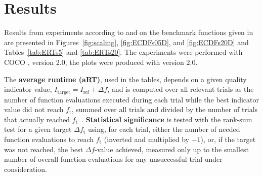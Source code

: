 \documentclass[sigconf]{acmart}
\newcommand{\Df}{\ensuremath{\Delta f}}
\newcommand{\ftarget}{\ensuremath{f_\mathrm{t}}}
\newcommand{\Itarget}{\ensuremath{I_\mathrm{target}}}
\newcommand{\hvref}{\ensuremath{I_\mathrm{ref}}}
\newcommand{\fopt}{\hvref}
\newcommand{\change}[1]{{\color{red} #1}}
\begin{document}
\section{Results}

Results from experiments according to \cite{hansen2016exp} and
\cite{hansen2016perfass} on the benchmark functions given in 
\cite{hansen2010noi} are presented in
Figures~\ref{fig:scaling}, \ref{fig:ECDFs05D}, and \ref{fig:ECDFs20D} and
Tables~\ref{tab:ERTs5} and \ref{tab:ERTs20}.
The experiments were performed with COCO \cite{hansen2016cocoplat}, version
\change{2.0}, the plots were produced with version \change{2.0}.

The \textbf{average runtime (aRT)}, used in the %
tables,
depends on a given quality indicator value, $\Itarget=\fopt+\Df$, and is
computed over all relevant trials as the number of function
evaluations executed during each trial while the best indicator value
did not reach \ftarget, summed over all trials and divided by the
number of trials that actually reached \ftarget\
\cite{hansen2016exp,price1997dev}.
\textbf{Statistical significance} is tested with the rank-sum test for a given
target $\Delta\ftarget$ using, for each trial,
either the number of needed function evaluations to reach
$\ftarget$ (inverted and multiplied by $-1$), or, if the target
was not reached, the best $\Df$-value achieved, measured only up to
the smallest number of overall function evaluations for any
unsuccessful trial under consideration.
\end{document}
